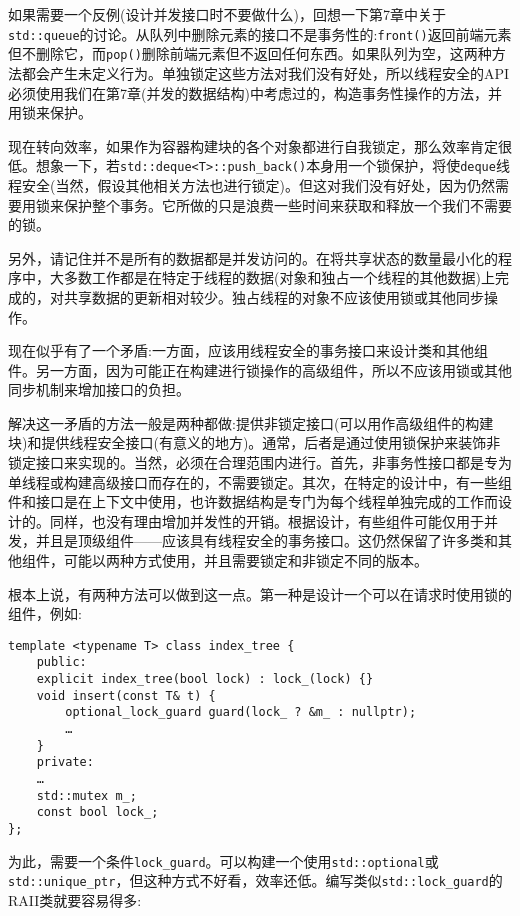 如果需要一个反例(设计并发接口时不要做什么)，回想一下第7章中关于\texttt{std::queue}的讨论。从队列中删除元素的接口不是事务性的:\texttt{front()}返回前端元素但不删除它，而\texttt{pop()}删除前端元素但不返回任何东西。如果队列为空，这两种方法都会产生未定义行为。单独锁定这些方法对我们没有好处，所以线程安全的API必须使用我们在第7章(并发的数据结构)中考虑过的，构造事务性操作的方法，并用锁来保护。

现在转向效率，如果作为容器构建块的各个对象都进行自我锁定，那么效率肯定很低。想象一下，若\texttt{std::deque<T>::push\_back()}本身用一个锁保护，将使\texttt{deque}线程安全(当然，假设其他相关方法也进行锁定)。但这对我们没有好处，因为仍然需要用锁来保护整个事务。它所做的只是浪费一些时间来获取和释放一个我们不需要的锁。

另外，请记住并不是所有的数据都是并发访问的。在将共享状态的数量最小化的程序中，大多数工作都是在特定于线程的数据(对象和独占一个线程的其他数据)上完成的，对共享数据的更新相对较少。独占线程的对象不应该使用锁或其他同步操作。

现在似乎有了一个矛盾:一方面，应该用线程安全的事务接口来设计类和其他组件。另一方面，因为可能正在构建进行锁操作的高级组件，所以不应该用锁或其他同步机制来增加接口的负担。 

解决这一矛盾的方法一般是两种都做:提供非锁定接口(可以用作高级组件的构建块)和提供线程安全接口(有意义的地方)。通常，后者是通过使用锁保护来装饰非锁定接口来实现的。当然，必须在合理范围内进行。首先，非事务性接口都是专为单线程或构建高级接口而存在的，不需要锁定。其次，在特定的设计中，有一些组件和接口是在上下文中使用，也许数据结构是专门为每个线程单独完成的工作而设计的。同样，也没有理由增加并发性的开销。根据设计，有些组件可能仅用于并发，并且是顶级组件——应该具有线程安全的事务接口。这仍然保留了许多类和其他组件，可能以两种方式使用，并且需要锁定和非锁定不同的版本。

根本上说，有两种方法可以做到这一点。第一种是设计一个可以在请求时使用锁的组件，例如:

\begin{lstlisting}[style=styleCXX]
template <typename T> class index_tree {
	public:
	explicit index_tree(bool lock) : lock_(lock) {}
	void insert(const T& t) {
		optional_lock_guard guard(lock_ ? &m_ : nullptr);
		…
	}
	private:
	…
	std::mutex m_;
	const bool lock_;
};
\end{lstlisting}

为此，需要一个条件\texttt{lock\_guard}。可以构建一个使用\texttt{std::optional}或\texttt{std::unique\_ptr}，但这种方式不好看，效率还低。编写类似\texttt{std::lock\_guard}的RAII类就要容易得多:

